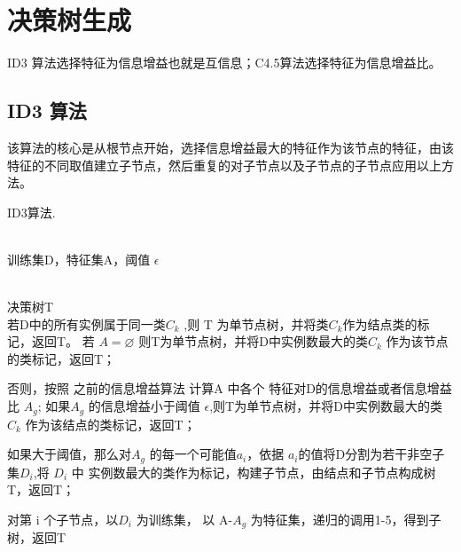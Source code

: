 \documentclass[UTF8]{ctexart}
\begin{document}
\section{决策树生成}
ID3 算法选择特征为信息增益也就是互信息；C4.5算法选择特征为信息增益比。
\subsection{ID3 算法}
该算法的核心是从根节点开始，选择信息增益最大的特征作为该节点的特征，由该特征的不同取值建立子节点，然后重复的对子节点以及子节点的子节点应用以上方法。

\begin{algorithm}[htb] 
	\caption{ ID3算法.} 
	\label{alg:Framworksss} 
	\begin{algorithmic}[1] %
		\REQUIRE ~~\\ %
		训练集D，特征集A，阈值 $\epsilon$
		
		\ENSURE ~~\\ %
		决策树T\\
		
		
		\STATE 
		若D中的所有实例属于同一类$C_k$ ,则 T 为单节点树，并将类$C_k$作为结点类的标记，返回T。
		\STATE 
		若 $A = \varnothing $    %
		则T为单节点树，并将D中实例数最大的类$C_k$ 作为该节点的类标记，返回T；
		
		\STATE 
		否则，按照 之前的信息增益算法 计算A 中各个 特征对D的信息增益或者信息增益比 $A_g$;
		\STATE 
		如果$A_g$ 的信息增益小于阈值 $\epsilon$,则T为单节点树，并将D中实例数最大的类$C_k$ 作为该结点的类标记，返回T；
		
		\STATE 
		如果大于阈值，那么对$A_g$ 的每一个可能值$a_i$，依据 $a_i$的值将D分割为若干非空子集$D_i$,将 $D_i$ 中 实例数最大的类作为标记，构建子节点，由结点和子节点构成树T，返回T；
		
		\STATE 
		对第 i 个子节点，以$D_i$ 为训练集， 以 A-${A_g}$ 为特征集，递归的调用1-5，得到子树，返回T 
	\end{algorithmic}
\end{algorithm}
\end{document}
